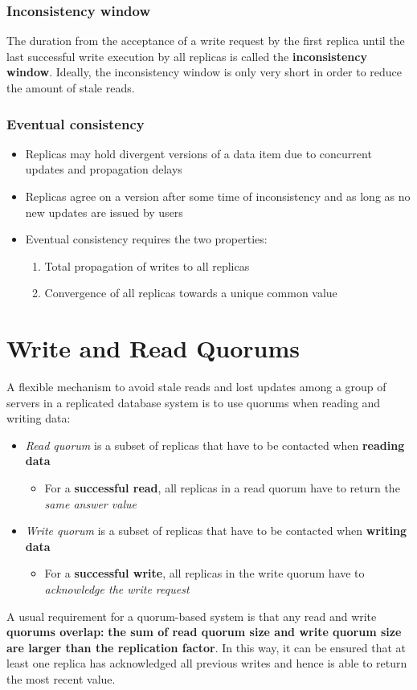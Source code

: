 \subsubsection{Inconsistency window}
The duration from the acceptance of a write request by the first replica until the last successful write execution by all replicas is called the \textbf{inconsistency window}. Ideally, the inconsistency window is only very short in order to reduce the amount of stale reads.

\subsubsection{Eventual consistency}
\begin{itemize}
    \item Replicas may hold divergent versions of a data item due to concurrent updates and propagation delays
    \item Replicas agree on a version after some time of inconsistency and as long as no new updates are issued by users
    \item Eventual consistency requires the two properties:
    \begin{enumerate}
        \item Total propagation of writes to all replicas
        \item Convergence of all replicas towards a unique common value
    \end{enumerate}
\end{itemize}

\section{Write and Read Quorums}
A flexible mechanism to avoid stale reads and lost updates among a group of servers in a replicated database system is to use quorums when reading and writing data:
\begin{itemize}
    \item \textit{Read quorum} is a subset of replicas that have to be contacted when \textbf{reading data}
    \begin{itemize}
        \item For a \textbf{successful read}, all replicas in a read quorum have to return the \textit{same answer value}
    \end{itemize}
    \item \textit{Write quorum} is a subset of replicas that have to be contacted when \textbf{writing data}
    \begin{itemize}
        \item For a \textbf{successful write}, all replicas in the write quorum have to \textit{acknowledge the write request}
    \end{itemize}
\end{itemize}
A usual requirement for a quorum-based system is that any read and write \textbf{quorums overlap:} \textbf{the sum of read quorum size and write quorum size are larger than the replication factor}. In this way, it can be ensured that at least one replica has acknowledged all previous writes and hence is able to return the most recent value.


